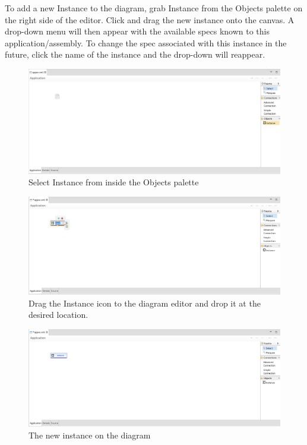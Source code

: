 \begin{flushleft}

To add a new Instance to the diagram, grab Instance from the Objects palette on the right side of the editor. Click and drag the new instance onto the canvas. A drop-down menu will then appear with the available specs known to this application/assembly. To change the spec associated with this instance in the future, click the name of the instance and the drop-down will reappear.

\begin{figure}[h!]
    \centering
	\includegraphics[scale=0.31]{figures/instance-selected.jpg}
	\caption{Select Instance from inside the Objects palette}
	\label{fig:figure16}
\end{figure}

\begin{figure}[h!]
    \centering
	\includegraphics[scale=0.31]{figures/instance-dropped.jpg}
	\caption{Drag the Instance icon to the diagram editor and drop it at the desired location.}
	\label{fig:figure17}
\end{figure}

\begin{figure}[h!]
    \centering
	\includegraphics[scale=0.31]{figures/instance-complete.jpg}
	\caption{The new instance on the diagram}
	\label{fig:figure18}
\end{figure}
\end{flushleft}
\newpage

